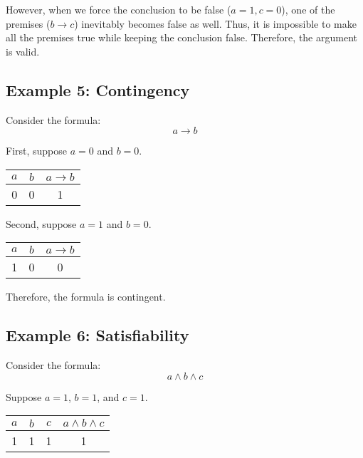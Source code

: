 \documentclass[12pt,a4paper,openany]{article}
\begin{document}
However, when we force the conclusion to be false ($a=1, c=0$), one of the premises ($b \rightarrow c$) inevitably becomes false as well. Thus, it is impossible to make all the premises true while keeping the conclusion false.
Therefore, the argument is valid.

\subsection{Example 5: Contingency}

Consider the formula:
$$ a \rightarrow b $$

First, suppose $a = 0$ and $b = 0$.

\begin{center}
\begin{tabular}{|c|c|c|}
\hline
$a$ & $b$ & $a \rightarrow b$ \\
\hline
\textcolor{falsecolor}{0} & \textcolor{falsecolor}{0} & \textcolor{truecolor}{1} \\
\hline
\end{tabular}
\end{center}

Second, suppose $a = 1$ and $b = 0$.

\begin{center}
\begin{tabular}{|c|c|c|}
\hline
$a$ & $b$ & $a \rightarrow b$ \\
\hline
\textcolor{truecolor}{1} & \textcolor{falsecolor}{0} & \textcolor{falsecolor}{0} \\
\hline
\end{tabular}
\end{center}

Therefore, the formula is contingent.

\subsection{Example 6: Satisfiability}

Consider the formula:
$$ a \land b \land c $$

Suppose $a = 1$, $b = 1$, and $c = 1$.

\begin{center}
\begin{tabular}{|c|c|c|c|}
\hline
$a$ & $b$ & $c$ & $a \land b \land c$ \\
\hline
\textcolor{truecolor}{1} & \textcolor{truecolor}{1} & \textcolor{truecolor}{1} & \textcolor{truecolor}{1} \\
\hline
\end{tabular}
\end{center}
\end{document}
